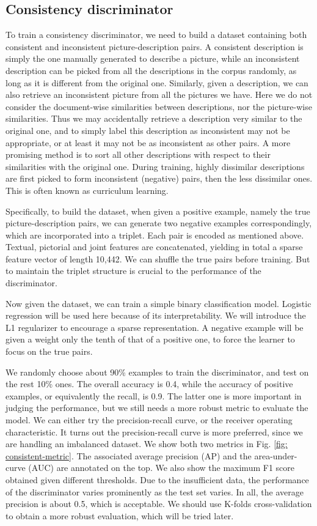 \documentclass{article} %
\begin{document}
\subsection{Consistency discriminator}
To train a consistency discriminator, we need to build a dataset containing both consistent and inconsistent picture-description pairs. A consistent description is simply the one manually generated to describe a picture, while an inconsistent description can be picked from all the descriptions in the corpus randomly, as long as it is different from the original one. Similarly, given a description, we can also retrieve an inconsistent picture from all the pictures we have. Here we do not consider the document-wise similarities between descriptions, nor the picture-wise similarities. Thus we may accidentally retrieve a description very similar to the original one, and to simply label this description as inconsistent may not be appropriate, or at least it may not be as inconsistent as other pairs. A more promising method is to sort all other descriptions with respect to their similarities with the original one. During training, highly dissimilar descriptions are first picked to form inconsistent (negative) pairs, then the less dissimilar ones. This is often known as curriculum learning. 

Specifically, to build the dataset, when given a positive example, namely the true picture-description pairs, we can generate two negative examples correspondingly, which are incorporated into a triplet. Each pair is encoded as mentioned above. Textual, pictorial and joint features are concatenated, yielding in total a sparse feature vector of length 10,442. We can shuffle the true pairs before training. But to maintain the triplet structure is crucial to the performance of the discriminator. 

Now given the dataset, we can train a simple binary classification model. Logistic regression will be used here because of its interpretability. We will introduce the L1 regularizer to encourage a sparse representation. A negative example will be given a weight only the tenth of that of a positive one, to force the learner to focus on the true pairs. 

We randomly choose about 90\% examples to train the discriminator, and test on the rest 10\% ones. The overall accuracy is 0.4, while the accuracy of positive examples, or equivalently the recall, is 0.9. The latter one is more important in judging the performance, but we still needs a more robust metric to evaluate the model. We can either try the precision-recall curve, or the receiver operating characteristic. It turns out the precision-recall curve is more preferred, since we are handling an imbalanced dataset. We show both two metrics in Fig. \ref{fig: consistent-metric}. The associated average precision (AP) and the area-under-curve (AUC) are annotated on the top. We also show the maximum F1 score obtained given different thresholds. Due to the insufficient data, the performance of the discriminator varies prominently as the test set varies. In all, the average precision is about 0.5, which is acceptable. We should use K-folds cross-validation to obtain a more robust evaluation, which will be tried later. 
\end{document}
